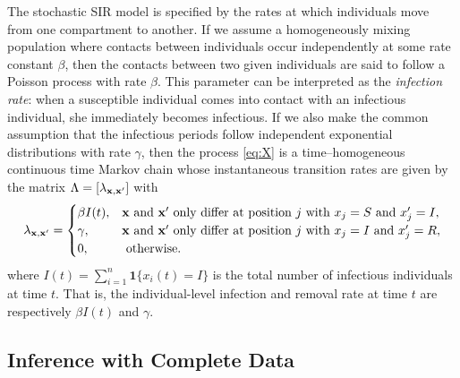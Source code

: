 \documentclass[11pt]{article}
\newcommand{\jx}[1]{{\color{blue}{ #1}}}
\begin{document}
	The stochastic SIR model is specified by the rates at which individuals move from one compartment to another. If we assume a homogeneously mixing population where contacts between individuals occur independently at some rate constant $\beta$, then the contacts between two given individuals are said to follow a Poisson process with rate $\beta$. This parameter can be interpreted as the \textit{infection rate}: when a susceptible individual comes into contact with an infectious individual, she immediately becomes infectious.
	If we also make the common assumption that the infectious periods follow independent exponential distributions with rate $\gamma$, then the process \ref{eq:X} is a time–homogeneous continuous time Markov chain whose instantaneous transition rates 
	are given by the matrix $\Lambda = [\lambda_{\mathbf{x}, \mathbf{x}'}]$ with
	$$
	\lambda_{\mathbf{x}, \mathbf{x}'} = 
	\begin{cases}
		\beta I(t), & \mathbf{x} \text{ and } \mathbf{x}' \text{ only differ at position } j \text{ with } x_j = S \text{ and } x_j' = I, \\
		\gamma, & \mathbf{x} \text{ and } \mathbf{x}' \text{ only differ at position } j \text{ with } x_j = I \text{ and } x_j' = R, \\
		0, & \text{ otherwise.}
	\end{cases}
	$$
	where $I(t) = \sum_{i=1}^n \mathbf{1} \{x_i(t) = I\}$ is the total number of infectious individuals at time $t$. That is, the individual-level infection and removal rate at time $t$ are respectively $\beta I(t)$ and $\gamma$.

	
	\subsection{Inference with Complete Data}
	\label{sec:icd}
	
\end{document}
